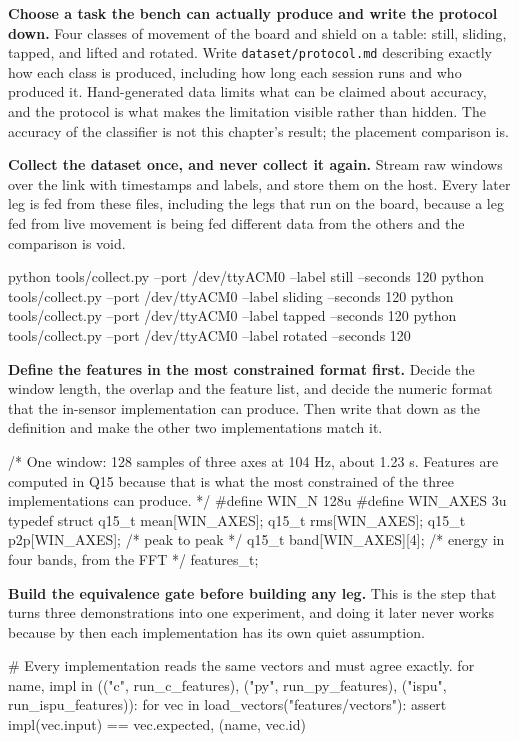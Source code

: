 \begin{steps}
\item \textbf{Choose a task the bench can actually produce and write the
protocol down.} Four classes of movement of the board and shield on a table:
still, sliding, tapped, and lifted and rotated. Write
\texttt{dataset/protocol.md} describing exactly how each class is produced,
including how long each session runs and who produced it. Hand-generated data
limits what can be claimed about accuracy, and the protocol is what makes the
limitation visible rather than hidden. The accuracy of the classifier is not
this chapter's result; the placement comparison is.

\item \textbf{Collect the dataset once, and never collect it again.} Stream raw
windows over the link with timestamps and labels, and store them on the host.
Every later leg is fed from these files, including the legs that run on the
board, because a leg fed from live movement is being fed different data from the
others and the comparison is void.
\begin{shellcode}
python tools/collect.py --port /dev/ttyACM0 --label still --seconds 120
python tools/collect.py --port /dev/ttyACM0 --label sliding --seconds 120
python tools/collect.py --port /dev/ttyACM0 --label tapped --seconds 120
python tools/collect.py --port /dev/ttyACM0 --label rotated --seconds 120
\end{shellcode}

\item \textbf{Define the features in the most constrained format first.} Decide
the window length, the overlap and the feature list, and decide the numeric
format that the in-sensor implementation can produce. Then write that down as
the definition and make the other two implementations match it.
\begin{ccode}
/* One window: 128 samples of three axes at 104 Hz, about 1.23 s.
   Features are computed in Q15 because that is what the most
   constrained of the three implementations can produce. */
#define WIN_N      128u
#define WIN_AXES     3u
typedef struct {
    q15_t mean[WIN_AXES];
    q15_t rms[WIN_AXES];
    q15_t p2p[WIN_AXES];          /* peak to peak */
    q15_t band[WIN_AXES][4];      /* energy in four bands, from the FFT */
} features_t;
\end{ccode}

\item \textbf{Build the equivalence gate before building any leg.} This is the
step that turns three demonstrations into one experiment, and doing it later
never works because by then each implementation has its own quiet assumption.
\begin{pycode}
# Every implementation reads the same vectors and must agree exactly.
for name, impl in (("c", run_c_features), ("py", run_py_features),
                   ("ispu", run_ispu_features)):
    for vec in load_vectors("features/vectors"):
        assert impl(vec.input) == vec.expected, (name, vec.id)
\end{pycode}


\end{steps}
